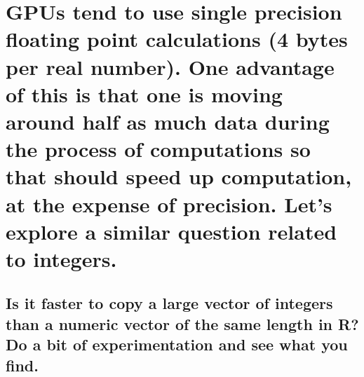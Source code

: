 \documentclass{article}\usepackage[]{graphicx}\usepackage[]{color}
\begin{document}
\section{GPUs tend to use single precision floating point calculations (4 bytes per real number). One advantage of this is that one is moving around half as much data during the process of computations so that should speed up computation, at the expense of precision. Let’s explore a similar question related to integers.}

\subsection{Is it faster to copy a large vector of integers than a numeric vector of the same length in R? Do a bit of experimentation and see what you find.} %
\end{document}
